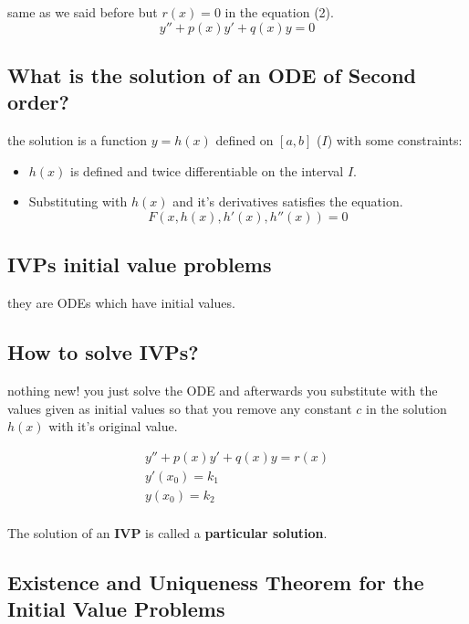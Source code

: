 \documentclass[11pt]{article}
\theoremstyle{definition}
\begin{document}
same as we said before but $r(x)=0$ in the equation (2).
\begin{equation}
\label{H}
    y''+p(x)y'+q(x)y=0
\end{equation}

\subsection{What  is the solution of an ODE of Second order?}
the solution is a function $y=h(x)$ defined on $[a,b]$ ($I$) with some constraints: 
\begin{itemize}
    \item $h(x)$ is defined and twice differentiable on the interval $I$.
    \item Substituting with $h(x)$ and it's derivatives satisfies the equation.
    \begin{equation}
        F(x, h(x), h'(x), h''(x)) = 0
    \end{equation}
    
\end{itemize}

\subsection{IVPs initial value problems}

they are ODEs which have initial values.

\subsection{How to solve IVPs?}
nothing new! you just solve the ODE and afterwards you substitute with the values given as initial values so that you remove any constant $c$ in the solution $h(x)$ with it's original value. 
\begin{shaded}
\begin{equation} 
\begin{split} 
  y''+p(x)y'+q(x)y=r(x) \\
  y'(x_0) = k_1 \\
  y(x_0) = k_2\\
  \end{split} 
\end{equation}
\end{shaded}

The solution of an \textbf{IVP} is called a \textbf{particular solution}.
\subsection{Existence and Uniqueness Theorem for the Initial Value Problems}
\end{document}
